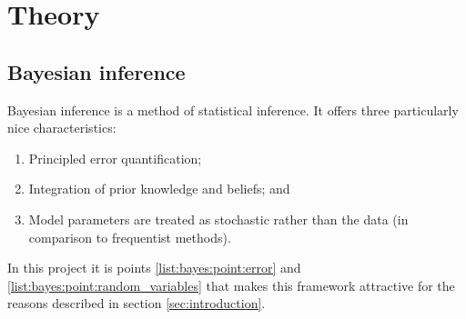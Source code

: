 \documentclass[14pt]{extarticle} %
\begin{document}
	
	
	
	

	
	
	
%	

	\section{Theory}	
	\subsection{Bayesian inference}	
	Bayesian inference is a method of statistical inference. It offers three particularly nice characteristics:
	\begin{enumerate} \label{list:bayes}
		\item \label{list:bayes:point:error} Principled error quantification; 
		\item Integration of prior knowledge and beliefs; and
		\item \label{list:bayes:point:random_variables} Model parameters are treated as stochastic rather than the data (in comparison to frequentist methods).
	\end{enumerate}
	In this project it is points \ref{list:bayes:point:error} and \ref{list:bayes:point:random_variables} that makes this framework attractive for the reasons described in section \ref{sec:introduction}.	
	
\end{document}
